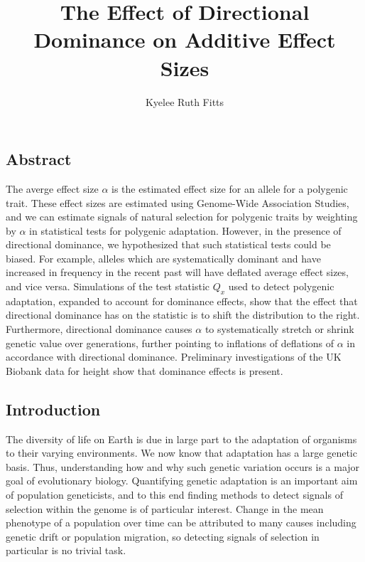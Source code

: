 \documentclass[a4paper,12pt]{article}
\begin{document}
\title{\vspace{-2cm}
  The Effect of Directional Dominance on Additive Effect Sizes
}
\author{Kyelee Ruth Fitts}
\maketitle


\subsection*{Abstract}
The averge effect size $\alpha$ is the estimated effect size for an
allele for a polygenic trait. These effect sizes are estimated using
Genome-Wide Association Studies, and we can estimate signals of natural
selection for polygenic traits by weighting by $\alpha$ in statistical
tests for polygenic adaptation. However, in the presence of
directional dominance, we hypothesized that such statistical tests
could be biased. For example, alleles which are systematically
dominant and have increased in frequency in the recent past will have
deflated average effect sizes, and vice versa. Simulations of the test
statistic $Q_x$ used to detect polygenic adaptation, expanded to
account for dominance effects, show that the effect that directional
dominance has on the statistic is to shift the distribution to the
right. Furthermore, directional dominance causes $\alpha$ to
systematically stretch or shrink genetic value over generations,
further pointing to inflations of deflations of $\alpha$ in accordance
with directional dominance. Preliminary investigations of the UK
Biobank data for height show that dominance effects is present.


\subsection*{Introduction}

The diversity of life on Earth is due in large part to the
adaptation of organisms to their varying environments. We now know that
adaptation has a large genetic basis. Thus, understanding how and why such
genetic variation occurs is a major goal of evolutionary
biology. Quantifying genetic adaptation is an important aim of population
geneticists, and to this end finding methods to detect signals of
selection within the genome is of particular interest. Change in the
mean phenotype of a population over time can be attributed to many causes including genetic
drift or population migration, so detecting signals of selection in
particular is no trivial task.
\end{document}
